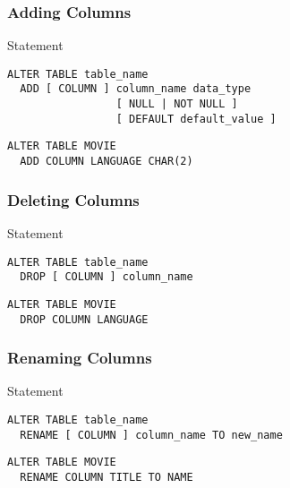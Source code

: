 \documentclass[dvipsnames]{beamer}
\theoremstyle{plain}
\begin{document}
\begin{frame}[fragile]
  \frametitle{Adding Columns}

  \begin{block}{Statement}
    \begin{lstlisting}
ALTER TABLE table_name
  ADD [ COLUMN ] column_name data_type
                 [ NULL | NOT NULL ]
                 [ DEFAULT default_value ]
    \end{lstlisting}
  \end{block}

  \pause
  \begin{example}
    \begin{lstlisting}
ALTER TABLE MOVIE
  ADD COLUMN LANGUAGE CHAR(2)
    \end{lstlisting}
  \end{example}
\end{frame}

\begin{frame}[fragile]
  \frametitle{Deleting Columns}

  \begin{block}{Statement}
    \begin{lstlisting}
ALTER TABLE table_name
  DROP [ COLUMN ] column_name
    \end{lstlisting}
  \end{block}

  \pause
  \begin{example}
    \begin{lstlisting}
ALTER TABLE MOVIE
  DROP COLUMN LANGUAGE
    \end{lstlisting}
  \end{example}
\end{frame}

\begin{frame}[fragile]
  \frametitle{Renaming Columns}

  \begin{block}{Statement}
    \begin{lstlisting}
ALTER TABLE table_name
  RENAME [ COLUMN ] column_name TO new_name
    \end{lstlisting}
  \end{block}

  \pause
  \begin{example}
    \begin{lstlisting}
ALTER TABLE MOVIE
  RENAME COLUMN TITLE TO NAME
    \end{lstlisting}
  \end{example}
\end{frame}
\end{document}

